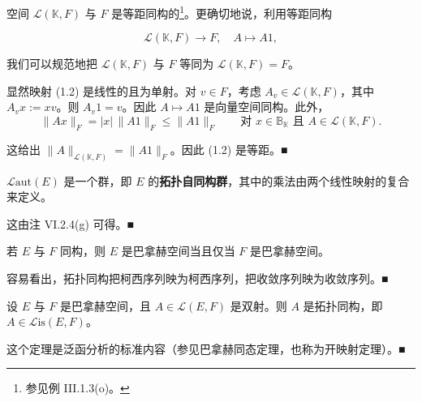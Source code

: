 \begin{remark}

\begin{items}
\item

空间 $ \mathcal{L}(\mathbb{K}, F) $ 与 $ F $ 是等距同构的\footnote{参见例 III.1.3(o)。}。更确切地说，利用等距同构

\begin{equation}
\mathcal{L}(\mathbb{K}, F) \to F , \quad A \mapsto A1 ,\tag{1.2}
\end{equation}

我们可以规范地把 $ \mathcal{L}(\mathbb{K}, F) $ 与 $ F $ 等同为 $ \mathcal{L}(\mathbb{K}, F) = F $。

\proofhead
显然映射 (1.2) 是线性的且为单射。对 $ v \in F $，考虑 $ A_{v} \in \mathcal{L}(\mathbb{K}, F) $，其中 $ A_{v}x := xv $。则 $ A_{v}1 = v $。因此 $ A \mapsto A1 $ 是向量空间同构。此外，
\[
\|Ax\|_{F} = |x|\,\|A1\|_{F} \le \|A1\|_{F} \qquad \text{对 } x \in \mathbb{B}_{\mathbb{K}} \text{ 且 } A \in \mathcal{L}(\mathbb{K}, F) .
\]

这给出 $ \|A\|_{\mathcal{L}(\mathbb{K}, F)} = \|A1\|_{F} $。因此 (1.2) 是等距。\nobreak\hspace{0.35em}■

\item

$ \mathcal{L}\mathrm{aut}(E) $ 是一个群，即 $ E $ 的\textbf{拓扑自同构群}，其中的乘法由两个线性映射的复合来定义。

\proofhead
这由注 VI.2.4(g) 可得。\nobreak\hspace{0.35em}■
\item

若 $ E $ 与 $ F $ 同构，则 $ E $ 是巴拿赫空间当且仅当 $ F $ 是巴拿赫空间。

\proofhead
容易看出，拓扑同构把柯西序列映为柯西序列，把收敛序列映为收敛序列。\nobreak\hspace{0.35em}■
\item

设 $ E $ 与 $ F $ 是巴拿赫空间，且 $ A \in \mathcal{L}(E, F) $ 是双射。则 $ A $ 是拓扑同构，即 $ A \in \mathcal{L}\mathrm{is}(E, F) $。

\proofhead
这个定理是泛函分析的标准内容（参见巴拿赫同态定理，也称为开映射定理）。\nobreak\hspace{0.35em}■
\end{items}

\end{remark}

